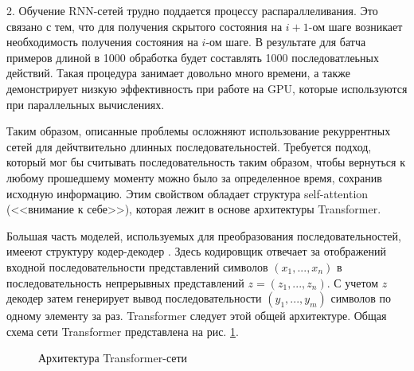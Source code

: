 \documentclass[14pt,a4paper]{extarticle}
\begin{document}
2. Обучение RNN-сетей трудно поддается процессу распараллеливания. Это связано с тем, что для получения скрытого состояния на $i + 1$-ом шаге возникает необходимость получения состояния на $i$-ом шаге. В результате для батча примеров длиной в 1000 обработка будет составлять 1000 последоватлеьных действий. Такая процедура занимает довольно много времени, а также демонстрирует низкую эффективность при работе на GPU, которые используются при параллельных вычислениях. 

Таким образом, описанные проблемы осложняют использование рекуррентных сетей для дейчтвительно длинных последовательностей. Требуется подход, который мог бы считывать последовательность таким образом, чтобы вернуться к любому прошедшему моменту можно было за определенное время, сохранив исходную информацию. Этим свойством обладает структура self-attention (<<внимание к себе>>), которая лежит в основе архитектуры Transformer. 

Большая часть моделей, используемых для преобразования последовательностей, имееют структуру кодер-декодер \cite{cod_decod}. Здесь кодировщик отвечает за отображений входной последовательности представлений символов $(x_1, ..., x_n)$ в последовательность непрерывных представлений $z = (z_1,...,z_n)$. С учетом $z$ декодер затем генерирует вывод
последовательности $(y_1, ..., y_m)$ символов по одному элементу за раз. 
Transformer следует этой общей архитектуре. Общая схема сети Transformer представлена на рис. \ref{trans_arh_lbl}.
\begin{figure}[h]
\caption{Архитектура Transformer-сети}
\label{trans_arh_lbl}
\end{figure}  
\end{document}
